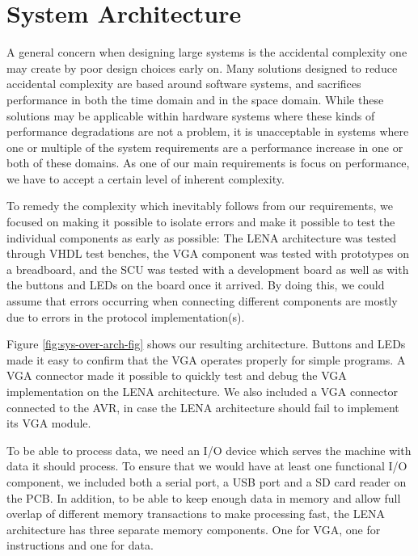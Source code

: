 \section{System Architecture}

A general concern when designing large systems is the accidental
complexity\cite[p.~8-9]{holt2004uml} one may create by poor design choices early
on. Many solutions designed to reduce accidental complexity are based around
software systems, and sacrifices performance in both the time domain and in the
space domain\cite{moseley2006out}. While these solutions may be applicable
within hardware systems where these kinds of performance degradations are not a
problem, it is unacceptable in systems where one or multiple of the system
requirements are a performance increase in one or both of these domains. As one
of our main requirements is focus on performance, we have to accept a certain
level of inherent complexity.


To remedy the complexity which inevitably follows from our requirements, we
focused on making it possible to isolate errors and make it possible to test
the individual components as early as possible: The \ac{LENA} architecture was
tested through \ac{VHDL} test benches, the \ac{VGA} component was tested with
prototypes on a breadboard, and the \ac{SCU} was tested with a development
board as well as with the buttons and \ac{LED}s on the board once it arrived.
By doing this, we could assume that errors occurring when connecting different
components are mostly due to errors in the protocol implementation(s).

Figure \ref{fig:sys-over-arch-fig} shows our resulting architecture. Buttons and
\acp{LED} made it easy to confirm that the \ac{VGA} operates properly for simple
programs. A \ac{VGA} connector made it possible to quickly test and debug the
\ac{VGA} implementation on the \ac{LENA} architecture. We also included a
\ac{VGA} connector connected to the AVR, in case the \ac{LENA} architecture
should fail to implement its \ac{VGA} module.

To be able to process data, we need an \ac{I/O} device which serves the machine
with data it should process. To ensure that we would have at least one
functional \ac{I/O} component, we included both a serial
port, a \ac{USB} port and a \ac{SD} card reader on the \ac{PCB}. In addition,
to be able to keep enough data in memory and allow full overlap of different memory
transactions to make processing fast, the \ac{LENA} architecture has three separate
memory components. One for \ac{VGA}, one for instructions and one for data.
